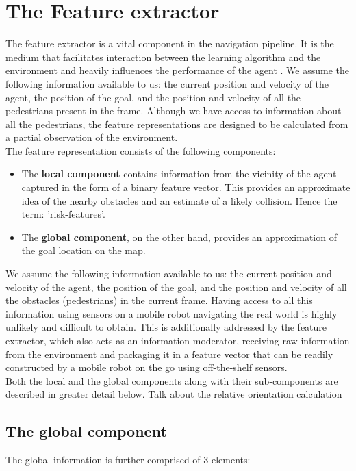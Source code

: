\section{The Feature extractor}
The feature extractor is a vital component in the navigation pipeline. It is the medium that facilitates interaction between the learning algorithm and the environment and heavily influences the performance of the agent \cite{vasquez_inverse_2014}. We assume the following information available to us: the current position and velocity of the agent, the position of the goal, and the position and velocity of all the pedestrians present in the frame. Although we have access to information about all the pedestrians, the feature representations are designed to be calculated from a partial observation of the environment.\\
The feature representation consists of the following components:
\begin{itemize}
    \item The \textbf{local component} contains information from the vicinity of the agent captured in the form of a binary feature vector. This provides an approximate idea of the nearby obstacles and an estimate of a likely collision. Hence the term: 'risk-features'. 
    \item The \textbf{global component}, on the other hand, provides an approximation of the goal location on the map. 
\end{itemize}
 We assume the following information available to us: the current position and velocity of the agent, the position of the goal, and the position and velocity of all the obstacles (pedestrians) in the current frame.  Having access to all this information using sensors on a mobile robot navigating the real world is highly unlikely and difficult to obtain. This is additionally addressed by the feature extractor, which also acts as an information moderator, receiving raw information from the environment and packaging it in a feature vector that can be readily constructed by a mobile robot on the go using off-the-shelf sensors.\\
 Both the local and the global components along with their sub-components are described in greater detail below.
Talk about the relative orientation calculation


\subsection*{The global component}
The global information is further comprised of 3 elements:

